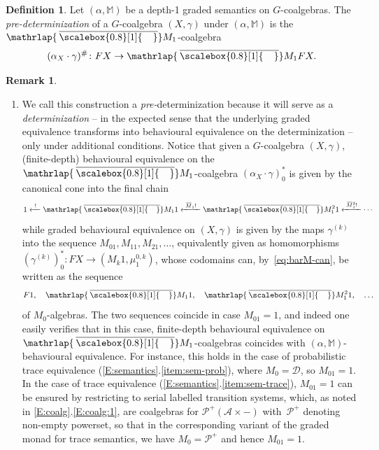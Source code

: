 \documentclass[sigconf,
			final%
			nonacm
                        ]{acmart}
\numberwithin{equation}{section}
\numberwithin{equation}{section}
\theoremstyle{plain}
\theoremstyle{definition}
\newtheorem{defn}[thm]{Definition}
\newtheorem{rem}[thm]{Remark}
\newcommand{\overbar}[1]{\mkern 1.5mu\overline{\mkern-2.5mu#1\mkern-1.5mu}\mkern 1.5mu}
\newcommand{\mybar}[3]{%
  \mathrlap{\hspace{#2}\overline{\scalebox{#1}[1]{\hphantom{\ensuremath{#3}}\vphantom{\rule{0pt}{5.5pt}}}}}\ensuremath{#3}
}
\newcommand{\barM}{\mybar{0.8}{2pt}{M}_1}
\newcommand{\xla}[1]{\xleftarrow{~#1~}}
\newcommand{\M}{\mathbb{M}}                   %
\newcommand{\A}{\mathcal{A}}            %
\newcommand{\pow}{\mathscr P}              %
\newcommand{\CalD}{\mathcal{D}}            %
\begin{document}
\begin{defn}\label{D:determinization}
Let $(\alpha, \M)$ be a depth-1 graded semantics on
$G$-coalgebras.
The \emph{pre-determinization} of a $G$-coalgebra
$(X, \gamma)$ under $(\alpha, \M)$
is the $\barM$-co\-al\-gebra
\begin{equation}\label{eq:det}
  (\alpha_X\cdot\gamma)^\#\colon FX\to \barM FX.
\end{equation}
\end{defn}
%
\begin{rem}\label{rem:determinization}
  \begin{enumerate}
  \item\label{item:predet-det} We call this construction a
    \emph{pre-}de\-ter\-mi\-ni\-zat\-ion because it will serve as a
    \emph{determinization} -- in the expected sense that the
    underlying graded equivalence transforms into behavioural
    equivalence on the determinization -- only under additional
    conditions. Notice that given a $G$-coalgebra $(X,\gamma)$,
    (finite-depth) behavioural equivalence on the $\barM$-coalgebra
    $(\alpha_X\cdot\gamma)^*_0$ is given by the canonical cone into
    the final chain
    \begin{equation*}
      1 \xla{!} \barM 1 \xla{\overbar M_1 !} \barM^{2}1 \xla{\overbar
          M_1^2 !} \cdots
    \end{equation*}
    while graded behavioural equivalence on $(X,\gamma)$ is given by
    the maps $\gamma^{(k)}$ into the sequence $M_01,M_11,M_21,\dots$,
    equivalently given as homomorphisms
    $(\gamma^{(k)})^*_0\colon FX\to(M_k1,\mu^{0,k}_1)$, whose codomains
    can, by~\eqref{eq:barM-can}, be written as the sequence
    \begin{equation*}
      F1,\quad \barM 1,\quad \barM^21,\quad \ldots
    \end{equation*}
    of $M_0$-algebras. The two sequences coincide in case $M_01=1$,
    and indeed one easily verifies that in this case, finite-depth
    behavioural equivalence on $\barM$-coalgebras coincides with
    $(\alpha,\M)$-behavioural equivalence.  For instance, this holds
    in the case of probabilistic trace equivalence
    (\cref{E:semantics}.\ref{item:sem-prob}), where $M_0=\CalD$, so
    $M_01=1$. In the case of trace equivalence
    (\cref{E:semantics}.\ref{item:sem-trace}), $M_01=1$ can be
    ensured by restricting to serial labelled transition systems,
    which, as noted in \cref{E:coalg}.\ref{E:coalg:1}, are
    coalgebras for $\pow^+(\A\times -)$ with~$\pow^+$ denoting
    non-empty powerset, so that in the corresponding variant of the
    graded monad for trace semantics, we have $M_0=\pow^+$ and hence
    $M_01=1$.


\end{enumerate}
\end{rem}
\end{document}
